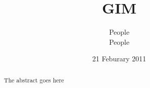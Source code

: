 \documentclass{l3proj}
\begin{document}
\title{GIM}
\author{People \\
People}
\date{21 Feburary 2011}
\maketitle
\begin{abstract}

The abstract goes here

\end{abstract}
\educationalconsent
\tableofcontents















\end{document}
